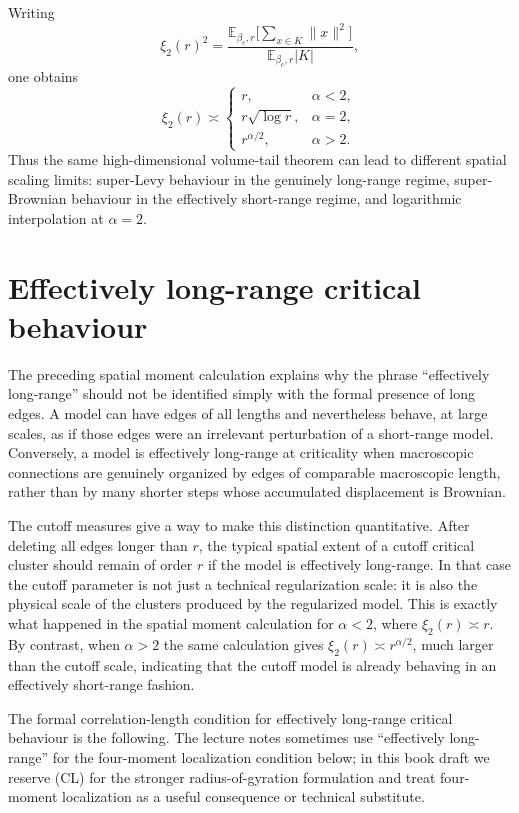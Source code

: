 \documentclass[11pt,reqno]{book}
\numberwithin{equation}{chapter}
\theoremstyle{plain}
\theoremstyle{definition}
\theoremstyle{remark}
\newcommand{\1}{\mathbf 1}
\newcommand{\norm}[1]{\lVert #1\rVert}
\begin{document}
Writing
\[
  \xi_2(r)^2=
  \frac{
    \mathbb E_{\beta_c,r}\bigl[\sum_{x\in K}\norm{x}^2\bigr]
  }{
    \mathbb E_{\beta_c,r}|K|
  },
\]
one obtains
\[
  \xi_2(r)\asymp
  \begin{cases}
    r, & \alpha<2,\\
    r\sqrt{\log r}, & \alpha=2,\\
    r^{\alpha/2}, & \alpha>2.
  \end{cases}
\]
Thus the same high-dimensional volume-tail theorem can lead to different spatial scaling limits: super-Levy behaviour in the genuinely long-range regime, super-Brownian behaviour in the effectively short-range regime, and logarithmic interpolation at $\alpha=2$.

\section{Effectively long-range critical behaviour}

The preceding spatial moment calculation explains why the phrase ``effectively long-range'' should not be identified simply with the formal presence of long edges. A model can have edges of all lengths and nevertheless behave, at large scales, as if those edges were an irrelevant perturbation of a short-range model. Conversely, a model is effectively long-range at criticality when macroscopic connections are genuinely organized by edges of comparable macroscopic length, rather than by many shorter steps whose accumulated displacement is Brownian.

The cutoff measures give a way to make this distinction quantitative. After deleting all edges longer than $r$, the typical spatial extent of a cutoff critical cluster should remain of order $r$ if the model is effectively long-range. In that case the cutoff parameter is not just a technical regularization scale: it is also the physical scale of the clusters produced by the regularized model. This is exactly what happened in the spatial moment calculation for $\alpha<2$, where $\xi_2(r)\asymp r$. By contrast, when $\alpha>2$ the same calculation gives $\xi_2(r)\asymp r^{\alpha/2}$, much larger than the cutoff scale, indicating that the cutoff model is already behaving in an effectively short-range fashion.

The formal correlation-length condition for effectively long-range critical behaviour is the following. The lecture notes sometimes use ``effectively long-range'' for the four-moment localization condition below; in this book draft we reserve (CL) for the stronger radius-of-gyration formulation and treat four-moment localization as a useful consequence or technical substitute.
\end{document}
